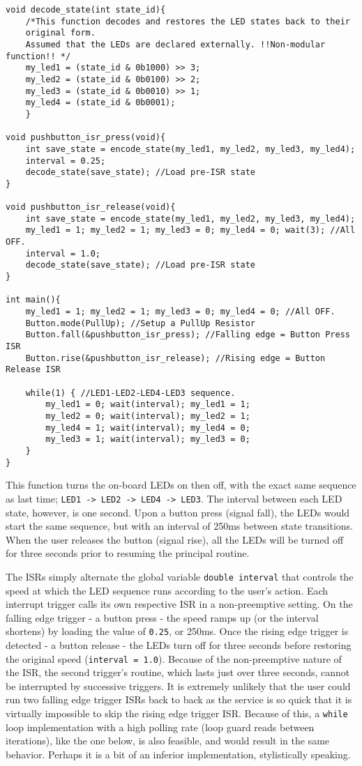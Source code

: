 \documentclass{article}
\begin{document}
\begin{verbatim}
void decode_state(int state_id){
    /*This function decodes and restores the LED states back to their
    original form.
    Assumed that the LEDs are declared externally. !!Non-modular function!! */
    my_led1 = (state_id & 0b1000) >> 3;
    my_led2 = (state_id & 0b0100) >> 2;
    my_led3 = (state_id & 0b0010) >> 1;
    my_led4 = (state_id & 0b0001);
    }

void pushbutton_isr_press(void){
    int save_state = encode_state(my_led1, my_led2, my_led3, my_led4);
    interval = 0.25;
    decode_state(save_state); //Load pre-ISR state
}

void pushbutton_isr_release(void){
    int save_state = encode_state(my_led1, my_led2, my_led3, my_led4);
    my_led1 = 1; my_led2 = 1; my_led3 = 0; my_led4 = 0; wait(3); //All OFF.
    interval = 1.0;
    decode_state(save_state); //Load pre-ISR state
}

int main(){
    my_led1 = 1; my_led2 = 1; my_led3 = 0; my_led4 = 0; //All OFF.
    Button.mode(PullUp); //Setup a PullUp Resistor
    Button.fall(&pushbutton_isr_press); //Falling edge = Button Press ISR
    Button.rise(&pushbutton_isr_release); //Rising edge = Button Release ISR
    
    while(1) { //LED1-LED2-LED4-LED3 sequence.
        my_led1 = 0; wait(interval); my_led1 = 1;
        my_led2 = 0; wait(interval); my_led2 = 1;
        my_led4 = 1; wait(interval); my_led4 = 0;
        my_led3 = 1; wait(interval); my_led3 = 0;
    }
}
\end{verbatim}

This function turns the on-board LEDs on then off, with the exact same sequence as last time; \texttt{LED1 -> LED2 -> LED4 -> LED3}. The interval between each LED state, however, is one second. Upon a button press (signal fall), the LEDs would start the same sequence, but with an interval of 250ms between state transitions. When the user releases the button (signal rise), all the LEDs will be turned off for three seconds prior to resuming the principal routine.

The ISRs simply alternate the global variable \texttt{double interval} that controls the speed at which the LED sequence runs according to the user's action. Each interrupt trigger calls its own respective ISR in a non-preemptive setting. On the falling edge trigger - a button press - the speed ramps up (or the interval shortens) by loading the value of \texttt{0.25}, or 250ms. Once the rising edge trigger is detected - a button release - the LEDs turn off for three seconds before restoring the original speed (\texttt{interval = 1.0}). Because of the non-preemptive nature of the ISR, the second trigger's routine, which lasts just over three seconds, cannot be interrupted by successive triggers. It is extremely unlikely that the user could run two falling edge trigger ISRs back to back as the service is so quick that it is virtually impossible to skip the rising edge trigger ISR. Because of this, a \texttt{while} loop implementation with a high polling rate (loop guard reads between iterations), like the one below, is also feasible, and would result in the same behavior. Perhaps it is a bit of an inferior implementation, stylistically speaking.
\end{document}
